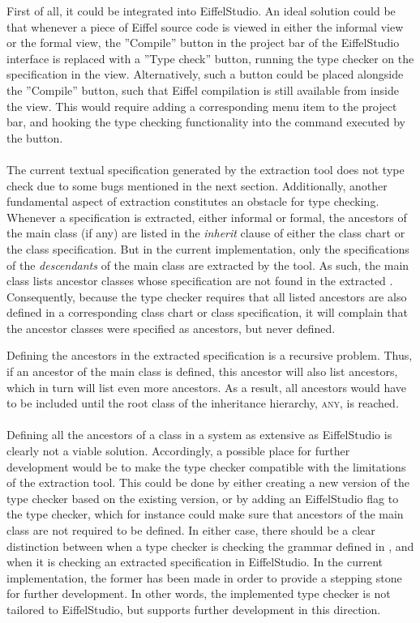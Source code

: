 First of all, it could be integrated into EiffelStudio. An ideal solution could be that whenever a piece of Eiffel source code is viewed in either the informal \bon{} view or the formal \bon{} view, the ''Compile'' button in the project bar of the EiffelStudio interface is replaced with a ''Type check'' button, running the type checker on the specification in the view. Alternatively, such a button could be placed alongside the ''Compile'' button, such that Eiffel compilation is still available from inside the \bon{} view. This would require adding a corresponding menu item to the project bar, and hooking the type checking functionality into the command executed by the button.

\paragraph{}
The current textual \bon{} specification generated by the extraction tool does not type check due to some bugs mentioned in the next section. Additionally, another fundamental aspect of extraction constitutes an obstacle for type checking. Whenever a specification is extracted, either informal or formal, the ancestors of the main class (if any) are listed in the \textit{inherit} clause of either the class chart or the class specification. But in the current implementation, only the specifications of the \emph{descendants} of the main class are extracted by the tool. As such, the main class lists ancestor classes whose specification are not found in the extracted \bon{}. Consequently, because the type checker requires that all listed ancestors are also defined in a corresponding class chart or class specification, it will complain that the ancestor classes were specified as ancestors, but never defined.

Defining the ancestors in the extracted specification is a recursive problem. Thus, if an ancestor of the main class is defined, this ancestor will also list ancestors, which in turn will list even more ancestors. As a result, all ancestors would have to be included until the root class of the inheritance hierarchy, \textsc{any}, is reached. 
\paragraph{}
Defining all the ancestors of a class in a system as extensive as EiffelStudio is clearly not a viable solution. Accordingly, a possible place for further development would be to make the type checker compatible with the limitations of the extraction tool. This could be done by either creating a new version of the type checker based on the existing version, or by adding an EiffelStudio flag to the type checker, which for instance could make sure that ancestors of the main class are not required to be defined. In either case, there should be a clear distinction between when a type checker is checking the grammar defined in \cite{walden1995}, and when it is checking an extracted specification in EiffelStudio. In the current implementation, the former has been made in order to provide a stepping stone for further development. In other words, the implemented type checker is not tailored to EiffelStudio, but supports further development in this direction.

